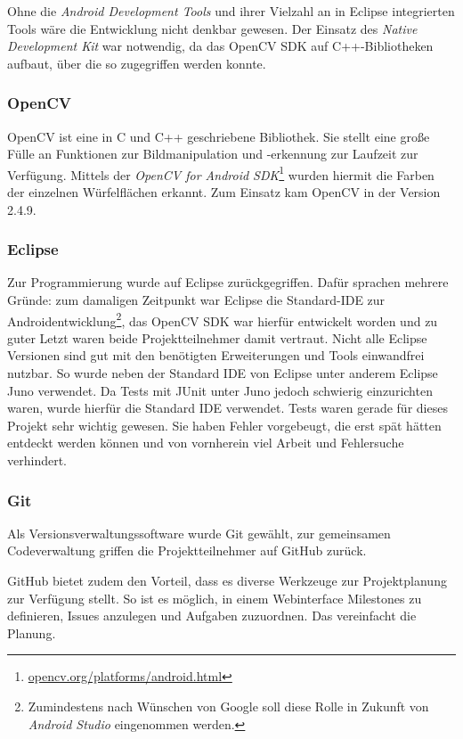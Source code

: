 Ohne die \emph{Android Development Tools} und ihrer Vielzahl an in Eclipse
integrierten Tools wäre die Entwicklung nicht denkbar gewesen. Der Einsatz des
\emph{Native Development Kit} war notwendig, da das OpenCV SDK auf
C++-Bibliotheken aufbaut, über die so zugegriffen werden konnte.

\subsubsection{OpenCV}  %

OpenCV ist eine in C und C++ geschriebene Bibliothek. Sie stellt eine große
Fülle an Funktionen zur Bildmanipulation und -erkennung zur Laufzeit zur
Verfügung. Mittels der \emph{OpenCV for Android
SDK}\footnote{\url{opencv.org/platforms/android.html}} wurden hiermit die Farben
der einzelnen Würfelflächen erkannt. Zum Einsatz kam OpenCV in der Version 2.4.9.

\subsubsection{Eclipse}  %

Zur Programmierung wurde auf Eclipse zurückgegriffen. Dafür sprachen mehrere
Gründe: zum damaligen Zeitpunkt war Eclipse die Standard-IDE zur
Androidentwicklung\footnote{Zumindestens nach Wünschen von Google soll diese
Rolle in Zukunft von \emph{Android Studio} eingenommen werden.}, das OpenCV SDK
war hierfür entwickelt worden und zu guter Letzt waren beide Projektteilnehmer damit vertraut.
Nicht alle Eclipse Versionen sind gut mit den benötigten Erweiterungen und Tools
einwandfrei nutzbar. So wurde neben der Standard IDE von Eclipse unter anderem
Eclipse Juno verwendet. Da Tests mit JUnit unter Juno jedoch schwierig einzurichten
waren, wurde hierfür die Standard IDE verwendet. Tests waren gerade für dieses Projekt
sehr wichtig gewesen. Sie haben Fehler vorgebeugt, die erst spät hätten entdeckt werden
können und von vornherein viel Arbeit und Fehlersuche verhindert.

\subsubsection{Git}  %

Als Versionsverwaltungssoftware wurde Git gewählt, zur gemeinsamen
Codeverwaltung griffen die Projektteilnehmer auf GitHub zurück.

GitHub bietet zudem den Vorteil, dass es diverse Werkzeuge zur Projektplanung zur
Verfügung stellt. So ist es möglich, in einem Webinterface Milestones zu
definieren, Issues anzulegen und Aufgaben zuzuordnen. Das vereinfacht die
Planung.


